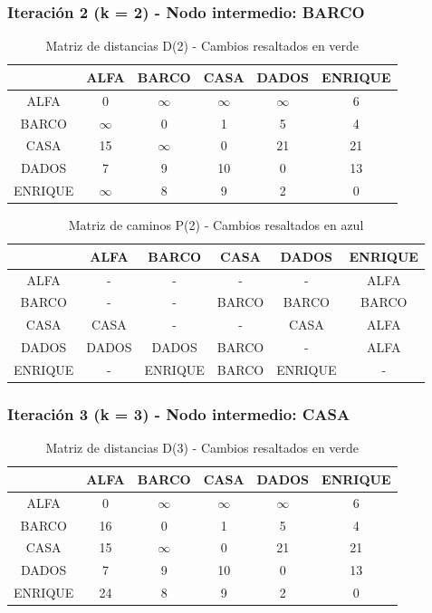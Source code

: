 \documentclass[12pt]{article}
\begin{document}
\subsubsection{Iteración 2 (k = 2) - Nodo intermedio: BARCO}
\begin{table}[h!]
\centering
\begin{tabular}{|c|c|c|c|c|c|}
\hline
 & ALFA & BARCO & CASA & DADOS & ENRIQUE \\\hline
ALFA & 0 & $\infty$ & $\infty$ & $\infty$ & 6 \\\hline
BARCO & $\infty$ & 0 & 1 & 5 & 4 \\\hline
CASA & 15 & $\infty$ & 0 & 21 & 21 \\\hline
DADOS & 7 & 9 & \cellcolor{lightgreen} 10 & 0 & 13 \\\hline
ENRIQUE & $\infty$ & 8 & \cellcolor{lightgreen} 9 & 2 & 0 \\\hline
\end{tabular}
\caption{Matriz de distancias D(2) - Cambios resaltados en verde}
\end{table}

\begin{table}[h!]
\centering
\begin{tabular}{|c|c|c|c|c|c|}
\hline
 & ALFA & BARCO & CASA & DADOS & ENRIQUE \\\hline
ALFA & - & - & - & - & ALFA \\\hline
BARCO & - & - & BARCO & BARCO & BARCO \\\hline
CASA & CASA & - & - & CASA & ALFA \\\hline
DADOS & DADOS & DADOS & \cellcolor{lightblue} BARCO & - & ALFA \\\hline
ENRIQUE & - & ENRIQUE & \cellcolor{lightblue} BARCO & ENRIQUE & - \\\hline
\end{tabular}
\caption{Matriz de caminos P(2) - Cambios resaltados en azul}
\end{table}

\subsubsection{Iteración 3 (k = 3) - Nodo intermedio: CASA}
\begin{table}[h!]
\centering
\begin{tabular}{|c|c|c|c|c|c|}
\hline
 & ALFA & BARCO & CASA & DADOS & ENRIQUE \\\hline
ALFA & 0 & $\infty$ & $\infty$ & $\infty$ & 6 \\\hline
BARCO & \cellcolor{lightgreen} 16 & 0 & 1 & 5 & 4 \\\hline
CASA & 15 & $\infty$ & 0 & 21 & 21 \\\hline
DADOS & 7 & 9 & 10 & 0 & 13 \\\hline
ENRIQUE & \cellcolor{lightgreen} 24 & 8 & 9 & 2 & 0 \\\hline
\end{tabular}
\caption{Matriz de distancias D(3) - Cambios resaltados en verde}
\end{table}
\end{document}
